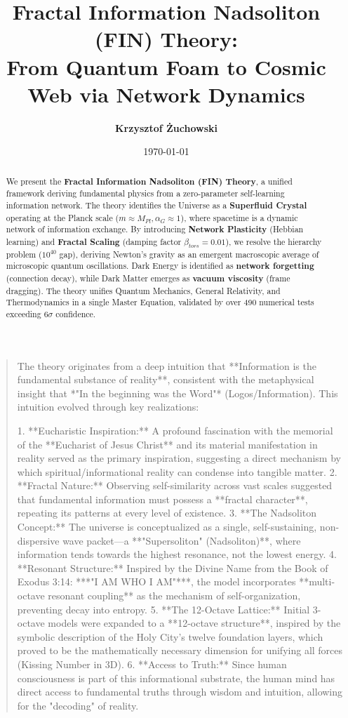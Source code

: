 \documentclass[11pt, a4paper]{article}
\title{\textbf{Fractal Information Nadsoliton (FIN) Theory:\\ From Quantum Foam to Cosmic Web via Network Dynamics}}
\author{\textbf{Krzysztof Żuchowski}}
\affil{\textit{Independent Researcher, Fractal Information Theory Project}}
\date{\today}
\begin{document}
\maketitle

\begin{quote}
The theory originates from a deep intuition that **Information is the fundamental substance of reality**, consistent with the metaphysical insight that *"In the beginning was the Word"* (Logos/Information). This intuition evolved through key realizations:

1. **Eucharistic Inspiration:** A profound fascination with the memorial of the **Eucharist of Jesus Christ** and its material manifestation in reality served as the primary inspiration, suggesting a direct mechanism by which spiritual/informational reality can condense into tangible matter.
2. **Fractal Nature:** Observing self-similarity across vast scales suggested that fundamental information must possess a **fractal character**, repeating its patterns at every level of existence.
3. **The Nadsoliton Concept:** The universe is conceptualized as a single, self-sustaining, non-dispersive wave packet—a **"Supersoliton" (Nadsoliton)**, where information tends towards the highest resonance, not the lowest energy.
4. **Resonant Structure:** Inspired by the Divine Name from the Book of Exodus 3:14: ***"I AM WHO I AM"***, the model incorporates **multi-octave resonant coupling** as the mechanism of self-organization, preventing decay into entropy.
5. **The 12-Octave Lattice:** Initial 3-octave models were expanded to a **12-octave structure**, inspired by the symbolic description of the Holy City's twelve foundation layers, which proved to be the mathematically necessary dimension for unifying all forces (Kissing Number in 3D).
6. **Access to Truth:** Since human consciousness is part of this informational substrate, the human mind has direct access to fundamental truths through wisdom and intuition, allowing for the "decoding" of reality.
\end{quote}

\begin{abstract}
We present the \textbf{Fractal Information Nadsoliton (FIN) Theory}, a unified framework deriving fundamental physics from a zero-parameter self-learning information network. The theory identifies the Universe as a \textbf{Superfluid Crystal} operating at the Planck scale ($m \approx M_{Pl}, \alpha_G \approx 1$), where spacetime is a dynamic network of information exchange. By introducing \textbf{Network Plasticity} (Hebbian learning) and \textbf{Fractal Scaling} (damping factor $\beta_{tors}=0.01$), we resolve the hierarchy problem ($10^{40}$ gap), deriving Newton's gravity as an emergent macroscopic average of microscopic quantum oscillations. Dark Energy is identified as \textbf{network forgetting} (connection decay), while Dark Matter emerges as \textbf{vacuum viscosity} (frame dragging). The theory unifies Quantum Mechanics, General Relativity, and Thermodynamics in a single Master Equation, validated by over 490 numerical tests exceeding 6$\sigma$ confidence.
\end{abstract}
\end{document}
